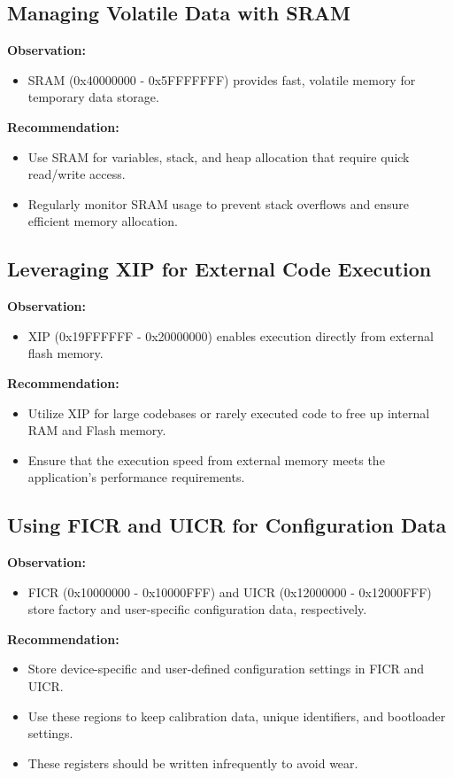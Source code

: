 \documentclass{Configuration_Files/PoliMi3i_thesis}
\begin{document}
\subsection{Managing Volatile Data with SRAM}
\textbf{Observation:}
\begin{itemize}
    \item SRAM (0x40000000 - 0x5FFFFFFF) provides fast, volatile memory for temporary data storage.
\end{itemize}

\textbf{Recommendation:}
\begin{itemize}
    \item Use SRAM for variables, stack, and heap allocation that require quick read/write access.
    \item Regularly monitor SRAM usage to prevent stack overflows and ensure efficient memory allocation.
\end{itemize}

\subsection{Leveraging XIP for External Code Execution}
\textbf{Observation:}
\begin{itemize}
    \item XIP (0x19FFFFFF - 0x20000000) enables execution directly from external flash memory.
\end{itemize}

\textbf{Recommendation:}
\begin{itemize}
    \item Utilize XIP for large codebases or rarely executed code to free up internal RAM and Flash memory.
    \item Ensure that the execution speed from external memory meets the application's performance requirements.
\end{itemize}

\subsection{Using FICR and UICR for Configuration Data}
\textbf{Observation:}
\begin{itemize}
    \item FICR (0x10000000 - 0x10000FFF) and UICR (0x12000000 - 0x12000FFF) store factory and user-specific configuration data, respectively.
\end{itemize}

\textbf{Recommendation:}
\begin{itemize}
    \item Store device-specific and user-defined configuration settings in FICR and UICR.
    \item Use these regions to keep calibration data, unique identifiers, and bootloader settings.
    \item These registers should be written infrequently to avoid wear.
\end{itemize}
\end{document}
